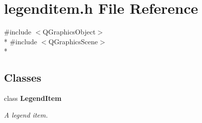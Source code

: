 \section{legenditem.\+h File Reference}
\label{bk3_2items_2legenditem_8h}
{\ttfamily \#include $<$Q\+Graphics\+Object$>$}\\*
{\ttfamily \#include $<$Q\+Graphics\+Scene$>$}\\*
\subsection*{Classes}
\begin{DoxyCompactItemize}
\item 
class {\bf Legend\+Item}
\begin{DoxyCompactList}\small\item\em A legend item. \end{DoxyCompactList}\end{DoxyCompactItemize}
